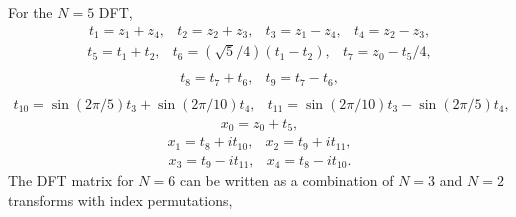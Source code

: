 \documentclass[fleqn,12pt]{article}
\begin{document}
%
For the $N=5$ DFT,
%
\begin{equation}
\begin{array}{llll}
t_1 = z_1 + z_4, &
t_2 = z_2 + z_3, &
t_3 = z_1 - z_4, &
t_4 = z_2 - z_3,
\end{array}
\end{equation}
\begin{equation}
\begin{array}{llll}
t_5 = t_1 + t_2, &
t_6 = (\sqrt{5}/4) (t_1 - t_2), &
t_7 = z_0 - t_5/4, \\
\end{array}
\end{equation}
\begin{equation}
\begin{array}{llll}
t_8 = t_7 + t_6, &
t_9 = t_7 - t_6, \\
\end{array}
\end{equation}
\begin{equation}
\begin{array}{llll}
t_{10} = \sin(2\pi/5) t_3 + \sin(2\pi/10) t_4, &
t_{11} = \sin(2\pi/10) t_3 - \sin(2\pi/5) t_4,
\end{array}
\end{equation}
\begin{equation}
\begin{array}{llll}
x_0 = z_0 + t_5,
\end{array}
\end{equation}
\begin{equation}
\begin{array}{llll}
x_1 = t_8 + i t_{10}, &
x_2 = t_9 + i t_{11},
\end{array}
\end{equation}
\begin{equation}
\begin{array}{llll}
x_3 = t_9 - i t_{11}, &
x_4 = t_8 - i t_{10}.
\end{array}
\end{equation}
%
The DFT matrix for $N=6$ can be written as a combination of $N=3$ and
$N=2$ transforms with index permutations,
%
\end{document}

